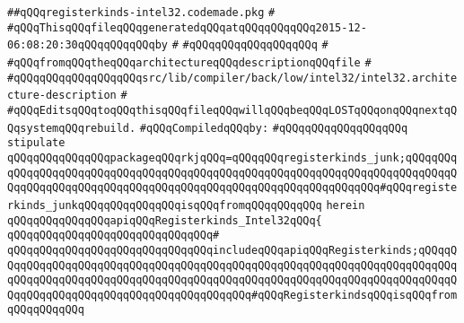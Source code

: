 \label{src/lib/compiler/back/low/intel32/code/registerkinds-intel32.codemade.pkg}
\verb|##qQQqregisterkinds-intel32.codemade.pkg|\newline
\verb|#|\newline
\verb|#qQQqThisqQQqfileqQQqgeneratedqQQqatqQQqqQQqqQQq2015-12-06:08:20:30qQQqqQQqqQQqby|\newline
\verb|#|\newline
\verb|#qQQqqQQqqQQqqQQqqQQq|\newline
\verb|#|\newline
\verb|#qQQqfromqQQqtheqQQqarchitectureqQQqdescriptionqQQqfile|\newline
\verb|#|\newline
\verb|#qQQqqQQqqQQqqQQqqQQqsrc/lib/compiler/back/low/intel32/intel32.architecture-description|\newline
\verb|#|\newline
\verb|#qQQqEditsqQQqtoqQQqthisqQQqfileqQQqwillqQQqbeqQQqLOSTqQQqonqQQqnextqQQqsystemqQQqrebuild.|\newline
\newline
\verb|#qQQqCompiledqQQqby:|\newline
\verb|#qQQqqQQqqQQqqQQqqQQq|\newline
\newline
\newline
\verb|stipulate|\newline
\verb|qQQqqQQqqQQqqQQqpackageqQQqrkjqQQq=qQQqqQQqregisterkinds_junk;qQQqqQQqqQQqqQQqqQQqqQQqqQQqqQQqqQQqqQQqqQQqqQQqqQQqqQQqqQQqqQQqqQQqqQQqqQQqqQQqqQQqqQQqqQQqqQQqqQQqqQQqqQQqqQQqqQQqqQQqqQQqqQQqqQQqqQQq#qQQqregisterkinds_junkqQQqqQQqqQQqqQQqisqQQqfromqQQqqQQqqQQq|\newline
\verb|herein|\newline
\newline
\verb|qQQqqQQqqQQqqQQqapiqQQqRegisterkinds_Intel32qQQq{|\newline
\verb|qQQqqQQqqQQqqQQqqQQqqQQqqQQqqQQq#|\newline
\verb|qQQqqQQqqQQqqQQqqQQqqQQqqQQqqQQqincludeqQQqapiqQQqRegisterkinds;qQQqqQQqqQQqqQQqqQQqqQQqqQQqqQQqqQQqqQQqqQQqqQQqqQQqqQQqqQQqqQQqqQQqqQQqqQQqqQQqqQQqqQQqqQQqqQQqqQQqqQQqqQQqqQQqqQQqqQQqqQQqqQQqqQQqqQQqqQQqqQQqqQQqqQQqqQQqqQQqqQQqqQQqqQQqqQQqqQQqqQQq#qQQqRegisterkindsqQQqisqQQqfromqQQqqQQqqQQq|\newline
